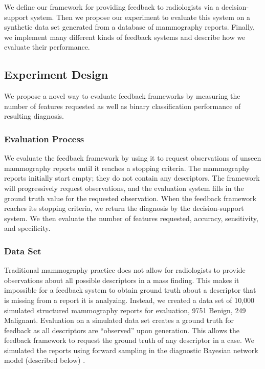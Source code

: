 We define our framework for providing feedback to radiologists via a decision-support system. Then we propose our experiment to evaluate this system on a synthetic data set generated from a database of mammography reports. Finally, we implement many different kinds of feedback systems and describe how we evaluate their performance.

\subsection{Experiment Design}
We propose a novel way to evaluate feedback frameworks by measuring the number of features requested as well as binary classification performance of resulting diagnosis.

\subsubsection{Evaluation Process}
We evaluate the feedback framework by using it to request observations of unseen mammography reports until it reaches a stopping criteria. The mammography reports initially start empty; they do not contain any descriptors. The framework will progressively request observations, and the evaluation system fills in the ground truth value for the requested observation. When the feedback framework reaches its stopping criteria, we return the diagnosis by the decision-support system. We then evaluate the number of features requested, accuracy, sensitivity, and specificity.

\subsubsection{Data Set}
Traditional mammography practice does not allow for radiologists to provide observations about all possible descriptors in a mass finding. This makes it impossible for a feedback system to obtain ground truth about a descriptor that is missing from a report it is analyzing. Instead, we created a data set of 10,000 simulated structured mammography reports for evaluation, 9751 Benign, 249 Malignant. Evaluation on a simulated data set creates a ground truth for feedback as all descriptors are ``observed'' upon generation. This allows the feedback framework to request the ground truth of any descriptor in a case. We simulated the reports using forward sampling in the diagnostic Bayesian network model (described below) \cite{Koller:2009wk}.

